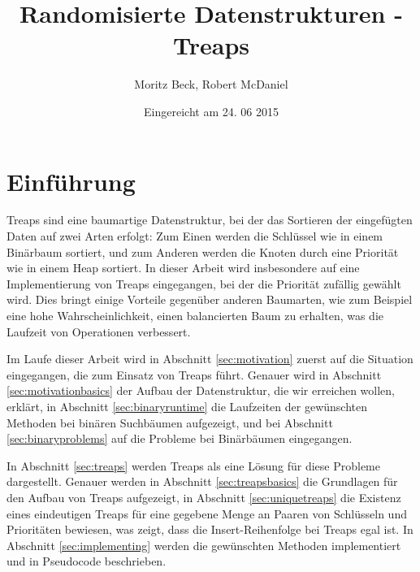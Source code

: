 \documentclass[a4paper]{scrreprt}
\theoremstyle{definition}
\begin{document}

\subject{Seminararbeit}
\title{Randomisierte Datenstrukturen - Treaps}
\author{Moritz Beck, Robert McDaniel}
\date{Eingereicht am 24. 06 2015} %
\titlehead{Julius-Maximilians-Universität Würzburg\\
Institut für Informatik\\
Lehrstuhl für Informatik I\\
Effiziente Algorithmen und wissensbasierte Systeme}
\publishers{Betreuer:\\
Prof.\ Dr.\ Alexander Wolff\\
Dipl.-Inf.\ Philipp Kindermann}
\maketitle
\tableofcontents


\chapter{Einführung}
\label{sec:intro}

Treaps sind eine baumartige Datenstruktur, bei der das Sortieren der eingefügten Daten auf zwei Arten erfolgt:
Zum Einen werden die Schlüssel wie in einem Binärbaum sortiert, und zum Anderen werden die Knoten durch eine Priorität wie in einem Heap sortiert.
In dieser Arbeit wird insbesondere auf eine Implementierung von Treaps eingegangen, bei der die Priorität zufällig gewählt wird.
Dies bringt einige Vorteile gegenüber anderen Baumarten, wie zum Beispiel eine hohe Wahrscheinlichkeit, einen balancierten Baum zu erhalten, was die Laufzeit von Operationen verbessert.

Im Laufe dieser Arbeit wird in Abschnitt \ref{sec:motivation} zuerst auf die Situation eingegangen, die zum Einsatz von Treaps führt.
Genauer wird in Abschnitt \ref{sec:motivationbasics} der Aufbau der Datenstruktur, die wir erreichen wollen, erklärt, in Abschnitt \ref{sec:binaryruntime} die Laufzeiten der gewünschten Methoden bei binären Suchbäumen aufgezeigt, und bei Abschnitt \ref{sec:binaryproblems} auf die Probleme bei Binärbäumen eingegangen.

In Abschnitt \ref{sec:treaps} werden Treaps als eine Lösung für diese Probleme dargestellt.
Genauer werden in Abschnitt \ref{sec:treapsbasics} die Grundlagen für den Aufbau von Treaps aufgezeigt, in Abschnitt \ref{sec:uniquetreaps} die Existenz eines eindeutigen Treaps für eine gegebene Menge an Paaren von Schlüsseln und Prioritäten bewiesen, was zeigt, dass die Insert-Reihenfolge bei Treaps egal ist. In Abschnitt \ref{sec:implementing} werden die gewünschten Methoden implementiert und in Pseudocode beschrieben.
\end{document}
